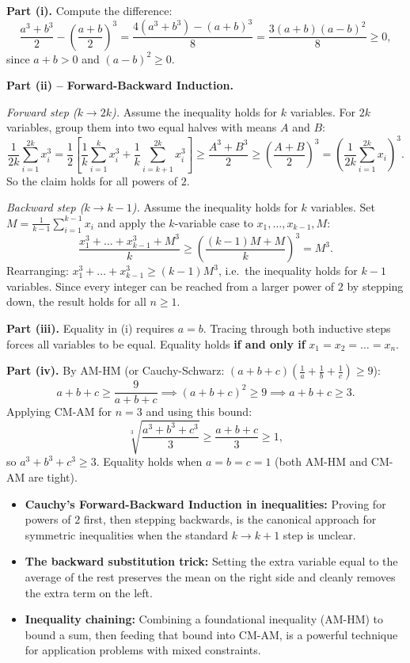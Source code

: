 \begin{solution}[Sketch]
\textbf{Part (i).}
Compute the difference:
\[
\frac{a^3 + b^3}{2} - \left(\frac{a+b}{2}\right)^3
= \frac{4(a^3+b^3)-(a+b)^3}{8}
= \frac{3(a+b)(a-b)^2}{8} \ge 0,
\]
since $a+b>0$ and $(a-b)^2\ge 0$.

\textbf{Part (ii) -- Forward-Backward Induction.}

\textit{Forward step ($k \to 2k$).} Assume the inequality holds for $k$ variables. For $2k$ variables, group them into two equal halves with means $A$ and $B$:
\[
\frac{1}{2k}\sum_{i=1}^{2k}x_i^3
= \frac{1}{2}\!\left[\frac{1}{k}\sum_{i=1}^{k}x_i^3 + \frac{1}{k}\sum_{i=k+1}^{2k}x_i^3\right]
\ge \frac{A^3+B^3}{2}
\ge \left(\frac{A+B}{2}\right)^3
= \left(\frac{1}{2k}\sum_{i=1}^{2k}x_i\right)^3.
\]
So the claim holds for all powers of $2$.

\textit{Backward step ($k \to k-1$).} Assume the inequality holds for $k$ variables. Set $M = \frac{1}{k-1}\sum_{i=1}^{k-1}x_i$ and apply the $k$-variable case to $x_1,\dots,x_{k-1},M$:
\[
\frac{x_1^3 + \dots + x_{k-1}^3 + M^3}{k} \ge \left(\frac{(k-1)M + M}{k}\right)^3 = M^3.
\]
Rearranging: $x_1^3+\dots+x_{k-1}^3 \ge (k-1)M^3$, i.e.\ the inequality holds for $k-1$ variables. Since every integer can be reached from a larger power of $2$ by stepping down, the result holds for all $n\ge 1$.

\textbf{Part (iii).} Equality in (i) requires $a=b$. Tracing through both inductive steps forces all variables to be equal. Equality holds \textbf{if and only if} $x_1 = x_2 = \dots = x_n$.

\textbf{Part (iv).}
By AM-HM (or Cauchy-Schwarz: $(a+b+c)\!\left(\frac{1}{a}+\frac{1}{b}+\frac{1}{c}\right)\ge 9$):
\[
a+b+c \ge \frac{9}{a+b+c} \implies (a+b+c)^2 \ge 9 \implies a+b+c \ge 3.
\]
Applying CM-AM for $n=3$ and using this bound:
\[
\sqrt[3]{\frac{a^3+b^3+c^3}{3}} \ge \frac{a+b+c}{3} \ge 1,
\]
so $a^3+b^3+c^3 \ge 3$. Equality holds when $a=b=c=1$ (both AM-HM and CM-AM are tight).
\end{solution}

\begin{takeaways}
\begin{itemize}[leftmargin=*]
    \item \textbf{Cauchy's Forward-Backward Induction in inequalities:} Proving for powers of $2$ first, then stepping backwards, is the canonical approach for symmetric inequalities when the standard $k\to k+1$ step is unclear.
    \item \textbf{The backward substitution trick:} Setting the extra variable equal to the average of the rest preserves the mean on the right side and cleanly removes the extra term on the left.
    \item \textbf{Inequality chaining:} Combining a foundational inequality (AM-HM) to bound a sum, then feeding that bound into CM-AM, is a powerful technique for application problems with mixed constraints.
\end{itemize}
\end{takeaways}

